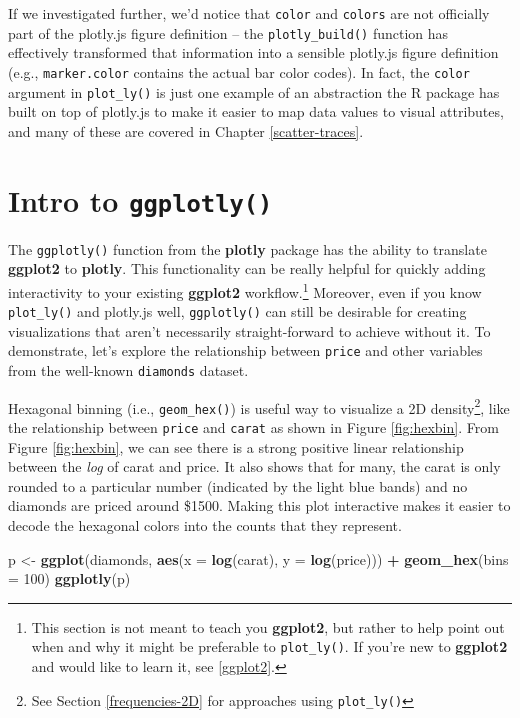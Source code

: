 \documentclass[
  12pt,
]{krantz}
\newenvironment{Shaded}{\begin{snugshade}}{\end{snugshade}}
\newcommand{\DataTypeTok}[1]{\textcolor[rgb]{0.13,0.29,0.53}{#1}}
\newcommand{\DecValTok}[1]{\textcolor[rgb]{0.00,0.00,0.81}{#1}}
\newcommand{\KeywordTok}[1]{\textcolor[rgb]{0.13,0.29,0.53}{\textbf{#1}}}
\newcommand{\NormalTok}[1]{#1}
\newcommand{\OperatorTok}[1]{\textcolor[rgb]{0.81,0.36,0.00}{\textbf{#1}}}
\newcommand{\StringTok}[1]{\textcolor[rgb]{0.31,0.60,0.02}{#1}}
\begin{document}
If we investigated further, we'd notice that \texttt{color} and \texttt{colors} are not officially part of the plotly.js figure definition -- the \texttt{plotly\_build()} function has effectively transformed that information into a sensible plotly.js figure definition (e.g., \texttt{marker.color} contains the actual bar color codes). In fact, the \texttt{color} argument in \texttt{plot\_ly()} is just one example of an abstraction the R package has built on top of plotly.js to make it easier to map data values to visual attributes, and many of these are covered in Chapter \ref{scatter-traces}.

\hypertarget{intro-ggplotly}{%
\section{\texorpdfstring{Intro to \texttt{ggplotly()}}{Intro to ggplotly()}}\label{intro-ggplotly}}

The \texttt{ggplotly()} function from the \textbf{plotly} package has the ability to translate \textbf{ggplot2} to \textbf{plotly}. This functionality can be really helpful for quickly adding interactivity to your existing \textbf{ggplot2} workflow.\footnote{This section is not meant to teach you \textbf{ggplot2}, but rather to help point out when and why it might be preferable to \texttt{plot\_ly()}. If you're new to \textbf{ggplot2} and would like to learn it, see \ref{ggplot2}.} Moreover, even if you know \texttt{plot\_ly()} and plotly.js well, \texttt{ggplotly()} can still be desirable for creating visualizations that aren't necessarily straight-forward to achieve without it. To demonstrate, let's explore the relationship between \texttt{price} and other variables from the well-known \texttt{diamonds} dataset.

Hexagonal binning (i.e., \texttt{geom\_hex()}) is useful way to visualize a 2D density\footnote{See Section \ref{frequencies-2D} for approaches using \texttt{plot\_ly()}}, like the relationship between \texttt{price} and \texttt{carat} as shown in Figure \ref{fig:hexbin}. From Figure \ref{fig:hexbin}, we can see there is a strong positive linear relationship between the \emph{log} of carat and price. It also shows that for many, the carat is only rounded to a particular number (indicated by the light blue bands) and no diamonds are priced around \$1500. Making this plot interactive makes it easier to decode the hexagonal colors into the counts that they represent.

\begin{Shaded}
\begin{Highlighting}[]
\NormalTok{p <-}\StringTok{ }\KeywordTok{ggplot}\NormalTok{(diamonds, }\KeywordTok{aes}\NormalTok{(}\DataTypeTok{x =} \KeywordTok{log}\NormalTok{(carat), }\DataTypeTok{y =} \KeywordTok{log}\NormalTok{(price))) }\OperatorTok{+}\StringTok{ }
\StringTok{  }\KeywordTok{geom_hex}\NormalTok{(}\DataTypeTok{bins =} \DecValTok{100}\NormalTok{)}
\KeywordTok{ggplotly}\NormalTok{(p)}
\end{Highlighting}
\end{Shaded}
\end{document}
